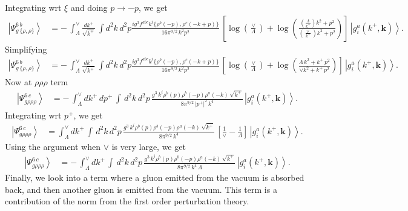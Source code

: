 \documentclass[aps,prd,amsmath,amssymb,nofootinbib]{revtex4-2}
\numberwithin{equation}{section}
\begin{document}
Integrating wrt $\xi$ and doing $p\rightarrow -p$, we get
\begin{align}
    \left|\Psi_{g\,\{\rho,\rho\}}^{6\, b}\right\rangle & =-\,\int_{\Lambda}^{\vee} \frac{dk^{+}}{\sqrt{k^{+}}}\, \int d^{2}k \, d^{2}p \frac{ig^{3}f^{abc}k^{i}\{\rho^{b}(-p),\rho^{c}(-k+p)\}}{16\pi^{9/2}\,k^{2}p^{2}}\,\left[\log{\left(\frac{\vee}{\Lambda}\right)}+\log{\left(\frac{\left(\frac{\Lambda}{k^{+}}\right) k^{2}+p^{2}}{\left(\frac{\vee}{k^{+}} \right)k^{2}+p^{2}}\right)}\right]\,\left|g_{i}^{a}(k^{+},\mathbf{k})\right\rangle.
\end{align}
Simplifying
\begin{align}\label{tworhoafter}
    \left|\Psi_{g\,\{\rho,\rho\}}^{6\, b}\right\rangle & =-\,\int_{\Lambda}^{\vee} \frac{dk^{+}}{\sqrt{k^{+}}}\, \int d^{2}k \, d^{2}p \frac{ig^{3}f^{abc}k^{i}\{\rho^{b}(-p),\rho^{c}(-k+p)\}}{16\pi^{9/2}\,k^{2}p^{2}}\,\left[\log{\left(\frac{\vee}{\Lambda}\right)}+\log{\left(\frac{\Lambda\, k^{2} + k^{+}\,p^{2}}{\vee k^{2}+k^{+}\,p^{2}}\right)}\right]\,\left|g_{i}^{a}(k^{+},\mathbf{k})\right\rangle.
\end{align}
Now at $\rho\rho\rho$ term
\begin{align}
    \left|\Psi_{g\rho\rho\rho}^{6\, c}\right\rangle & = -\, \int_{\Lambda}^{\vee} dk^{+}\, dp^{+}\, \int\, d^{2}k\, d^{2}p\, \frac{g^{3}\, k^{i}\rho^{b}(p)\rho^{b}(-p)\rho^{a}(-k)\,\sqrt{k^{+}}}{8\pi^{9/2}\,|p^{+}|^{2}\,k^{4}}\,\left|g_{i}^{a}(k^{+},\mathbf{k})\right\rangle. 
\end{align}
Integrating wrt $p^{+}$, we get
\begin{align}
    \left|\Psi_{g\rho\rho\rho}^{6\, c}\right\rangle & = \int_{\Lambda}^{\vee} dk^{+}\, \int\, d^{2}k\, d^{2}p\, \frac{g^{3}\, k^{i}\rho^{b}(p)\rho^{b}(-p)\rho^{a}(-k)\,\sqrt{k^{+}}}{8\pi^{9/2}\,k^{4}}\, \left[\frac{1}{\vee}-\frac{1}{\Lambda}\right]\,\left|g_{i}^{a}(k^{+},\mathbf{k})\right\rangle.
\end{align}
Using the argument when $\vee$ is very large, we get
\begin{align}\label{threerhoafter}
        \left|\Psi_{g\rho\rho\rho}^{6\, c}\right\rangle & = -\,\int_{\Lambda}^{\vee} dk^{+}\, \int\, d^{2}k\, d^{2}p\, \frac{g^{3}\, k^{i}\rho^{b}(p)\rho^{b}(-p)\rho^{a}(-k)\,\sqrt{k^{+}}}{8\pi^{9/2}\,k^{4}\, \Lambda}\,\left|g_{i}^{a}(k^{+},\mathbf{k})\right\rangle.
\end{align}
Finally, we look into a term where a gluon emitted from the vacuum is absorbed back, and then another gluon is emitted from the vacuum. This term is a contribution of the norm from the first order perturbation theory.
\end{document}
